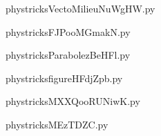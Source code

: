     \newcommand{\CaptionFigVectoMilieuNuWgHW}{<+Type your caption here+>}
    \begin{center}
        
    \end{center}
    phystricksVectoMilieuNuWgHW.py

    

    \clearpage
    


    \newcommand{\CaptionFigFJPooMGmakN}{<+Type your caption here+>}
    \begin{center}
        
    \end{center}
    phystricksFJPooMGmakN.py

    

    \clearpage
    


    \newcommand{\CaptionFigParabolezBeHFl}{<+Type your caption here+>}
    \begin{center}
        
    \end{center}
    phystricksParabolezBeHFl.py

    

    \clearpage
    


    \newcommand{\CaptionFigfigureHFdjZpb}{<+Type your caption here+>}
    \begin{center}
        
    \end{center}
    phystricksfigureHFdjZpb.py

    

    \clearpage
    


    \newcommand{\CaptionFigMXXQooRUNiwK}{<+Type your caption here+>}
    \begin{center}
        
    \end{center}
    phystricksMXXQooRUNiwK.py

    

    \clearpage
    


    \newcommand{\CaptionFigMEzTDZC}{<+Type your caption here+>}
    \begin{center}
        
    \end{center}
    phystricksMEzTDZC.py


